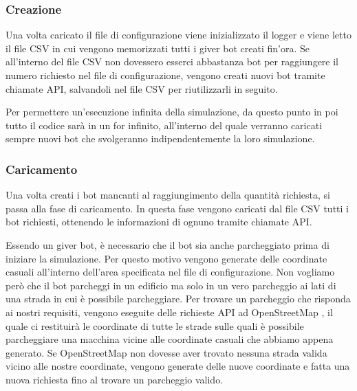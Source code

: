 \documentclass[main.tex]{subfiles}
\begin{document}


\subsubsection{Creazione}\label{fig:giver create}
Una volta caricato il file di configurazione viene inizializzato il logger e viene letto il file CSV in cui vengono memorizzati tutti i giver bot creati fin'ora. \newline
Se all'interno del file CSV non dovessero esserci abbastanza bot per raggiungere il numero richiesto nel file di configurazione, vengono creati nuovi bot tramite chiamate API, salvandoli nel file CSV per riutilizzarli in seguito.


Per permettere un'esecuzione infinita della simulazione, da questo punto in poi tutto il codice sarà in un for infinito, all'interno del quale verranno caricati sempre nuovi bot che svolgeranno indipendentemente la loro simulazione.

\subsubsection{Caricamento} \label{fig:giver load}
Una volta creati i bot mancanti al raggiungimento della quantità richiesta, si passa alla fase di caricamento. In questa fase vengono caricati dal file CSV tutti i bot richiesti, ottenendo le informazioni di ognuno tramite chiamate API. \newline


Essendo un giver bot, è necessario che il bot sia anche parcheggiato prima di iniziare la simulazione. Per questo motivo vengono generate delle coordinate casuali all'interno dell'area specificata nel file di configurazione. Non vogliamo però che il bot parcheggi in un edificio ma solo in un vero parcheggio ai lati di una strada in cui è possibile parcheggiare.\newline
Per trovare un parcheggio che risponda ai nostri requisiti, vengono eseguite delle richieste API ad OpenStreetMap \cite{OpenStreetMap}, il quale ci restituirà le coordinate di tutte le strade sulle quali è possibile parcheggiare una macchina vicine alle coordinate casuali che abbiamo appena generato. Se OpenStreetMap non dovesse aver trovato nessuna strada valida vicino alle nostre coordinate, vengono generate delle nuove coordinate e fatta una nuova richiesta fino al trovare un parcheggio valido.
\end{document}
